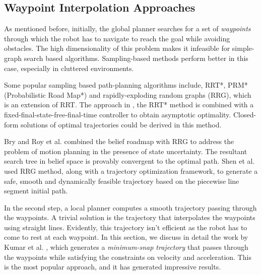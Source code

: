 
\subsection{Waypoint Interpolation Approaches}
\label{sec:waypoint}
As mentioned before, initially, the global planner searches for a set of \textit{waypoints} through which the robot has to navigate to reach the goal while avoiding obstacles. The high dimensionality of this problem makes it infeasible for simple-graph search based algorithms. Sampling-based methods perform better in this case, especially in cluttered environments. 

Some popular sampling based path-planning algorithms include, RRT*, PRM* (Probabilistic Road Map*) and rapidly-exploding random graphs (RRG), which is an extension of RRT. The approach in \cite{webb2013kinodynamic}, the RRT* method is combined with a fixed-final-state-free-final-time controller to obtain asymptotic optimality. Closed-form solutions of optimal trajectories could be derived in this method. 

Bry and Roy et al. \cite{bry2011rapidly} combined the belief roadmap with RRG to address the problem of motion planning in the presence of state uncertainty. The resultant search tree in belief space is provably convergent to the optimal path. Shen et al. \cite{shen2017gradient} used RRG method, along with a trajectory optimization framework, to generate a safe, smooth and dynamically feasible trajectory based on the piecewise line segment initial path. 

In the second step, a local planner computes a smooth trajectory passing through the waypoints. A trivial solution is the trajectory that interpolates the waypoints using straight lines. Evidently, this trajectory isn't efficient as the robot has to come to rest at each waypoint. In this section, we discuss in detail the work by Kumar et al. \cite{mellinger2011minimum}, which generates a \textit{minimum-snap trajectory} that passes through the waypoints while satisfying the constraints on velocity and acceleration. This is the most popular approach, and it has generated impressive results. 

